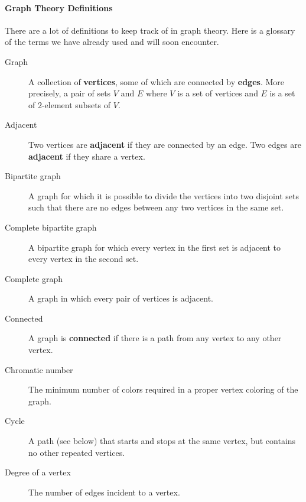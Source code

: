 \documentclass[11pt,]{book}
\newcommand{\terminology}[1]{\textbf{#1}}
\theoremstyle{ptxplainnotitle}
\theoremstyle{ptxplaintitle}
\theoremstyle{ptxdefinitionnotitle}
\theoremstyle{ptxdefinitiontitle}
\theoremstyle{ptxdefinitionnotitle}
\theoremstyle{ptxdefinitiontitle}
\theoremstyle{ptxdefinitionnotitle}
\theoremstyle{ptxdefinitiontitle}
\theoremstyle{ptxdefinitiontitlenonumber}
\theoremstyle{ptxdefinitiontitlenonumber}
\numberwithin{equation}{chapter}
\begin{document}
\paragraph[{Graph Theory Definitions}]{Graph Theory Definitions}\hypertarget{paragraphs-7}{}
\hypertarget{p-2611}{}%
There are a lot of definitions to keep track of in graph theory.  Here is a glossary of the terms we have already used and will soon encounter. \leavevmode%
\begin{description}
\item[{Graph}]\hypertarget{li-1275}{}\hypertarget{p-2612}{}%
 A collection of \terminology{vertices}, some of which are connected by \terminology{edges}. More precisely, a pair of sets \(V\) and \(E\) where \(V\) is a set of vertices and \(E\) is a set of 2-element subsets of \(V\).%
\item[{Adjacent}]\hypertarget{li-1276}{}\hypertarget{p-2613}{}%
 Two vertices are \terminology{adjacent} if they are connected by an edge. Two edges are \terminology{adjacent} if they share a vertex.%
\item[{Bipartite graph}]\hypertarget{li-1277}{}\hypertarget{p-2614}{}%
 A graph for which it is possible to divide the vertices into two disjoint sets such that there are no edges between any two vertices in the same set.%
\item[{Complete bipartite graph}]\hypertarget{li-1278}{}\hypertarget{p-2615}{}%
A bipartite graph for which every vertex in the first set is adjacent to every vertex in the second set.%
\item[{Complete graph}]\hypertarget{li-1279}{}\hypertarget{p-2616}{}%
 A graph in which every pair of vertices is adjacent.%
\item[{Connected}]\hypertarget{li-1280}{}\hypertarget{p-2617}{}%
 A graph is \terminology{connected} if there is a path from any vertex to any other vertex.%
\item[{Chromatic number}]\hypertarget{li-1281}{}\hypertarget{p-2618}{}%
 The minimum number of colors required in a proper vertex coloring of the graph.%
\item[{Cycle}]\hypertarget{li-1282}{}\hypertarget{p-2619}{}%
 A path (see below) that starts and stops at the same vertex, but contains no other repeated vertices.%
\item[{Degree of a vertex}]\hypertarget{li-1283}{}\hypertarget{p-2620}{}%
 The number of edges incident to a vertex.%

\end{description}
\end{document}
